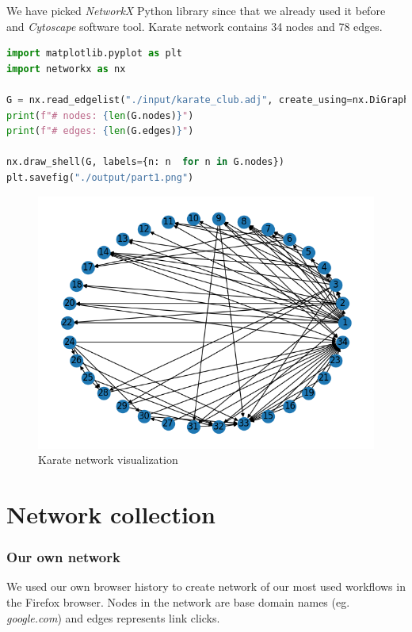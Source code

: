 \documentclass[11pt,a4paper]{article}
\begin{document}
We have picked \textit{NetworkX} Python library since that we already used it before and \textit{Cytoscape} software tool.
Karate network contains 34 nodes and 78 edges.

\begin{lstlisting}[language=Python, caption=src/part1.py]
import matplotlib.pyplot as plt
import networkx as nx

G = nx.read_edgelist("./input/karate_club.adj", create_using=nx.DiGraph)
print(f"# nodes: {len(G.nodes)}")
print(f"# edges: {len(G.edges)}")

nx.draw_shell(G, labels={n: n  for n in G.nodes})
plt.savefig("./output/part1.png")
\end{lstlisting}

\begin{figure}[h]
\caption{Karate network visualization}
\includegraphics[width=0.4\paperwidth]{imgs/part1.png}
\centering
\end{figure}

\pagebreak

\section{Network collection}

\subsubsection*{Our own network}

We used our own browser history to create network of our most used workflows in the Firefox browser. Nodes in the network are base domain names (eg. \textit{google.com}) and edges represents link clicks.
\end{document}
